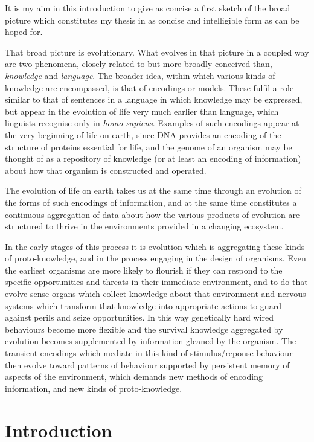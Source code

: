 \documentclass[10pt,titlepage]{book}
\begin{document}
It is my aim in this introduction to give as concise a first sketch of the broad picture which constitutes my thesis in as concise and intelligible form as can be hoped for.

That broad picture is evolutionary.
What evolves in that picture in a coupled way are two phenomena, closely related to but more broadly conceived than, \emph{knowledge} and \emph{language}.
The broader idea, within which various kinds of knowledge are encompassed, is that of encodings or models.
These fulfil a role similar to that of sentences in a language in which knowledge may be expressed, but appear in the evolution of life very much earlier than language, which linguists recognise only in \emph{homo sapiens}.
Examples of such encodings appear at the very beginning of life on earth, since DNA provides an encoding of the structure of proteins essential for life, and the genome of an organism may be thought of as a repository of knowledge (or at least an encoding of information) about how that organism is constructed and operated.

The evolution of life on earth takes us at the same time through an evolution of the forms of such encodings of information, and at the same time constitutes a continuous aggregation of data about how the various products of evolution are structured to thrive in the environments provided in a changing ecosystem.

In the early stages of this process it is evolution which is aggregating these kinds of proto-knowledge, and in the process engaging in the design of organisms.
Even the earliest organisms are more likely to flourish if they can respond to the specific opportunities and threats in their immediate environment, and to do that evolve sense organs which collect knowledge about that environment and nervous systems which transform that knowledge into appropriate actions to guard against perils and seize opportunities.
In this way genetically hard wired behaviours become more flexible and the survival knowledge aggregated by evolution becomes supplemented by information gleaned by the organism.
The transient encodings which mediate in this kind of stimulus/reponse behaviour then evolve toward patterns of behaviour supported by persistent memory of aspects of the environment, which demands new methods of encoding information, and new kinds of proto-knowledge.


\chapter{Introduction}
\end{document}
